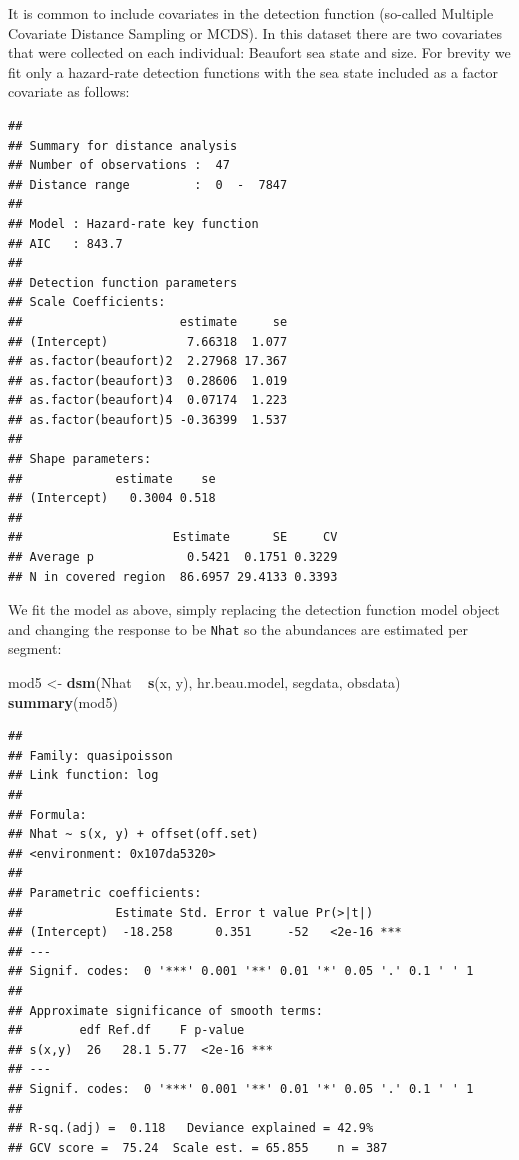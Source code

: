 \documentclass[]{amsart}
\newenvironment{Shaded}{}{}
\newcommand{\KeywordTok}[1]{\textcolor[rgb]{0.00,0.44,0.13}{\textbf{{#1}}}}
\newcommand{\DataTypeTok}[1]{\textcolor[rgb]{0.56,0.13,0.00}{{#1}}}
\newcommand{\StringTok}[1]{\textcolor[rgb]{0.25,0.44,0.63}{{#1}}}
\newcommand{\OtherTok}[1]{\textcolor[rgb]{0.00,0.44,0.13}{{#1}}}
\newcommand{\NormalTok}[1]{{#1}}
\begin{document}
It is common to include covariates in the detection function (so-called
Multiple Covariate Distance Sampling or MCDS). In this dataset there are
two covariates that were collected on each individual: Beaufort sea
state and size. For brevity we fit only a hazard-rate detection
functions with the sea state included as a factor covariate as follows:

\begin{Shaded}
\end{Shaded}

\begin{verbatim}
## 
## Summary for distance analysis 
## Number of observations :  47 
## Distance range         :  0  -  7847 
## 
## Model : Hazard-rate key function 
## AIC   : 843.7 
## 
## Detection function parameters
## Scale Coefficients:  
##                      estimate     se
## (Intercept)           7.66318  1.077
## as.factor(beaufort)2  2.27968 17.367
## as.factor(beaufort)3  0.28606  1.019
## as.factor(beaufort)4  0.07174  1.223
## as.factor(beaufort)5 -0.36399  1.537
## 
## Shape parameters:  
##             estimate    se
## (Intercept)   0.3004 0.518
## 
##                     Estimate      SE     CV
## Average p             0.5421  0.1751 0.3229
## N in covered region  86.6957 29.4133 0.3393
\end{verbatim}

We fit the model as above, simply replacing the detection function model
object and changing the response to be \texttt{Nhat} so the abundances
are estimated per segment:

\begin{Shaded}
\begin{Highlighting}[]
\NormalTok{mod5 <-}\StringTok{ }\KeywordTok{dsm}\NormalTok{(Nhat ~}\StringTok{ }\KeywordTok{s}\NormalTok{(x, y), hr.beau.model, segdata, obsdata)}
\KeywordTok{summary}\NormalTok{(mod5)}
\end{Highlighting}
\end{Shaded}

\begin{verbatim}
## 
## Family: quasipoisson 
## Link function: log 
## 
## Formula:
## Nhat ~ s(x, y) + offset(off.set)
## <environment: 0x107da5320>
## 
## Parametric coefficients:
##             Estimate Std. Error t value Pr(>|t|)    
## (Intercept)  -18.258      0.351     -52   <2e-16 ***
## ---
## Signif. codes:  0 '***' 0.001 '**' 0.01 '*' 0.05 '.' 0.1 ' ' 1
## 
## Approximate significance of smooth terms:
##        edf Ref.df    F p-value    
## s(x,y)  26   28.1 5.77  <2e-16 ***
## ---
## Signif. codes:  0 '***' 0.001 '**' 0.01 '*' 0.05 '.' 0.1 ' ' 1
## 
## R-sq.(adj) =  0.118   Deviance explained = 42.9%
## GCV score =  75.24  Scale est. = 65.855    n = 387
\end{verbatim}
\end{document}
